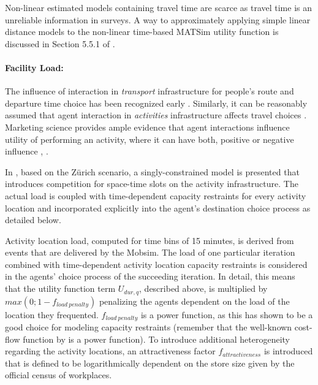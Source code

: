 Non-linear estimated models containing travel time are scarce as travel time is an unreliable information in surveys. A way to approximately applying simple linear distance models to the non-linear time-based MATSim utility function is discussed in Section 5.5.1 of \citet[][]{Horni_PhDThesis_2013}.

\paragraph{Facility Load:}
The influence of interaction in \emph{transport} infrastructure for people's route and departure time choice has been recognized early \citep[e.\,g.,][]{Pigou_1920, Knight_QJE_1924, Wardrop_PICE_1952}. Similarly, it can be reasonably assumed that agent interaction in \emph{activities} infrastructure affects travel choices \citep[][]{Axhausen_SSRL_2006}. Marketing science provides ample evidence that agent interactions influence utility of performing an activity, where it can have both, positive or negative influence \citep[][p.331]{BakerJEtAl_JAMS_1994}, \citep[][]{ErogluAndHarrell_JR_1986, ErogluAndMachleit_JR_1990, ErogluEtAl_JBR_2005, HarrellEtAl_JMR_1980, HuiAndBateson_JCR_1991, PonsEtAl_PsychMark_2006}.

In \citet[][]{HorniEtAl_TRR_2009}, based on the Zürich scenario, a singly-constrained model is presented that introduces competition for space-time slots on the activity infrastructure. The actual load is coupled with time-dependent capacity restraints for every activity location and incorporated explicitly into the agent's destination choice process as detailed below. 

Activity location load, computed for time bins of 15 minutes, is derived from events that are delivered by the Mobsim. The load of one particular iteration combined with time-dependent activity location capacity restraints is considered in the agents' choice process of the succeeding iteration. In detail, this means that the utility function term $U_{dur,q}$, described above, is multiplied by $max(0; 1 - f_{load\ penalty})$ penalizing the agents dependent on the load of the location they frequented. $f_{load\ penalty}$ is a power function, as this has shown to be a good choice for modeling capacity restraints (remember that the well-known cost-flow function by \citet[][]{TA_manual_1964} is a power function). To introduce additional heterogeneity regarding the activity locations, an attractiveness factor $f_{attractiveness}$ is introduced that is defined to be logarithmically dependent on the store size given by the official census of workplaces.

